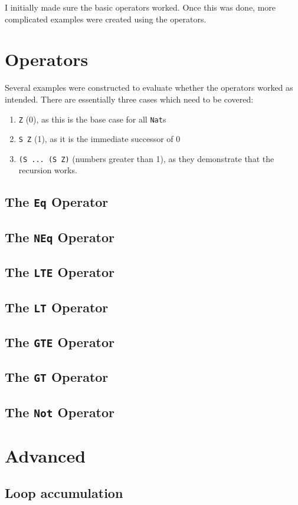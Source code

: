 I initially made sure the basic operators worked. Once this was done, more
complicated examples were created using the operators.
\section{Operators}
	Several examples were constructed to evaluate whether the operators worked
	as intended. There are essentially three cases which need to be covered:
	\begin{enumerate}
		\item \texttt{Z} (0), as this is the base case for all \texttt{Nat}s
		\item \texttt{S Z} (1), as it is the immediate successor of 0
		\item \texttt{(S ... (S Z)} (numbers greater than 1), as they
			  demonstrate that the recursion works.
	\end{enumerate}
    \subsection{The \texttt{Eq} Operator}
    
    \subsection{The \texttt{NEq} Operator}
    
    \subsection{The \texttt{LTE} Operator}
    
    \subsection{The \texttt{LT} Operator}
    
    \subsection{The \texttt{GTE} Operator}
    
    \subsection{The \texttt{GT} Operator}
    
    \subsection{The \texttt{Not} Operator}

\section{Advanced}
    \subsection{Loop accumulation}
